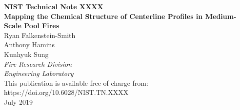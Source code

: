 \documentclass[12pt]{article}
\newcommand{\pubnumber}{XXXX}
\newcommand{\DOI}{https://doi.org/10.6028/NIST.TN.XXXX}
\newcommand{\monthyear}{July 2019}
\begin{document}
\begin{titlepage}
\begin{flushright}
\LARGE{\textbf{NIST Technical Note \pubnumber}}\\
\vfill
\Huge{\textbf{Mapping the Chemical Structure of Centerline Profiles in Medium-Scale Pool Fires}}\\
\vfill
\normalsize Ryan Falkenstein-Smith\\
Anthony Hamins\\
Kunhyuk Sung\\
\textit{Fire Research Division}\\
\textit{Engineering Laboratory}\\
\vspace{12pt}
\vfill
\normalsize This publication is available free of charge from:\\
\DOI\\
\vfill
\normalsize \monthyear
\vfill


\end{flushright}
\end{titlepage}
\end{document}
